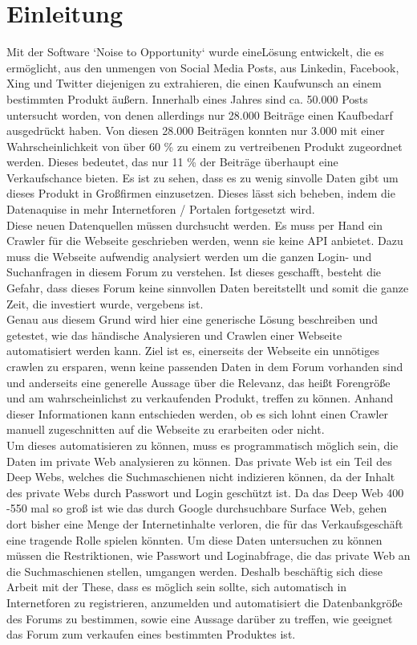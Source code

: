 \section {Einleitung}
Mit der Software `Noise to Opportunity` wurde eineLösung entwickelt, die es ermöglicht, aus den unmengen von Social Media Posts, aus Linkedin, Facebook, Xing und Twitter diejenigen zu extrahieren, die einen Kaufwunsch an einem bestimmten Produkt äußern. Innerhalb eines Jahres sind ca. 50.000 Posts untersucht worden, von denen allerdings nur 28.000 Beiträge einen Kaufbedarf ausgedrückt haben. Von diesen 28.000 Beiträgen konnten nur 3.000 mit einer Wahrscheinlichkeit von über 60 \% zu einem zu vertreibenen Produkt zugeordnet werden. Dieses bedeutet, das nur 11 \% der Beiträge überhaupt eine Verkaufschance bieten.
Es ist zu sehen, dass es zu wenig sinvolle Daten gibt um dieses Produkt in Großfirmen einzusetzen. Dieses lässt sich beheben, indem die \\ Datenaquise in mehr Internetforen / Portalen fortgesetzt wird.\\
Diese neuen Datenquellen müssen durchsucht werden. Es muss per Hand ein Crawler für die Webseite geschrieben werden, wenn sie keine API anbietet. Dazu muss die Webseite aufwendig analysiert werden um die ganzen Login- und Suchanfragen in diesem Forum zu verstehen. Ist dieses geschafft, besteht die Gefahr, dass dieses Forum keine sinnvollen Daten bereitstellt und somit die ganze Zeit, die investiert wurde, vergebens ist.\\
Genau aus diesem Grund wird hier eine generische Lösung beschreiben und getestet, wie das händische Analysieren und Crawlen einer Webseite automatisiert werden kann. Ziel ist es, einerseits der Webseite ein unnötiges crawlen zu ersparen, wenn keine passenden Daten in dem Forum vorhanden sind und anderseits eine generelle Aussage über die Relevanz, das heißt Forengröße und am wahrscheinlichst zu verkaufenden Produkt, treffen zu können. Anhand dieser Informationen kann entschieden werden, ob es sich lohnt einen Crawler manuell zugeschnitten auf die Webseite zu erarbeiten oder nicht.\\
Um dieses automatisieren zu können, muss es programmatisch möglich sein, die Daten im private Web analysieren zu können. Das private Web ist ein Teil des Deep Webs, welches die Suchmaschienen nicht indizieren können, da der Inhalt des private Webs durch Passwort und Login geschützt ist. Da das Deep Web 400 -550 mal so groß ist wie das durch Google durchsuchbare Surface Web, gehen dort bisher eine Menge der Internetinhalte verloren, die für das Verkaufsgeschäft eine tragende Rolle spielen könnten. Um diese Daten untersuchen zu können müssen die Restriktionen, wie Passwort und Loginabfrage, die das private Web an die Suchmaschienen stellen, umgangen werden.
Deshalb beschäftig sich diese Arbeit mit der These, dass es möglich sein sollte, sich automatisch in Internetforen zu registrieren, anzumelden und automatisiert die Datenbankgröße des Forums zu bestimmen, sowie eine Aussage darüber zu treffen, wie geeignet das Forum zum verkaufen eines bestimmten Produktes ist.
\newpage